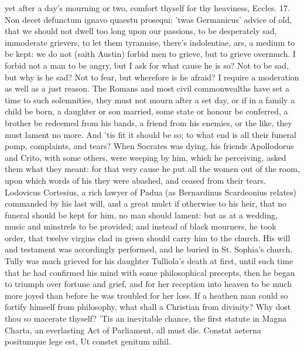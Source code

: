 {yet after a day's mourning or two, comfort thyself for thy heaviness,
Eccles.  17. Non decet defunctum ignavo quaestu prosequi;
'twas Germanicus' advice of old, that we should not dwell too long upon
our passions, to be desperately sad, immoderate grievers, to let them
tyrannise, there's indolentiae, ars, a medium to be kept: we do not
(saith Austin) forbid men to grieve, but to grieve overmuch. I
forbid not a man to be angry, but I ask for what cause he is so? Not to
be sad, but why is he sad? Not to fear, but wherefore is he afraid? I
require a moderation as well as a just reason. The Romans and
most civil commonwealths have set a time to such solemnities, they must
not mourn after a set day, or if in a family a child be born, a
daughter or son married, some state or honour be conferred, a brother
be redeemed from his bands, a friend from his enemies, or the like,
they must lament no more. And 'tis fit it should be so; to what end is
all their funeral pomp, complaints, and tears? When Socrates was dying,
his friends Apollodorus and Crito, with some others, were weeping by
him, which he perceiving, asked them what they meant: for that
very cause he put all the women out of the room, upon which words of
his they were abashed, and ceased from their tears. Lodovicus
Cortesius, a rich lawyer of Padua (as  Bernardinus Scardeonius
relates) commanded by his last will, and a great mulct if otherwise to
his heir, that no funeral should be kept for him, no man should lament:
but as at a wedding, music and minstrels to be provided; and instead of
black mourners, he took order, that twelve virgins clad in green
should carry him to the church. His will and testament was accordingly
performed, and he buried in St. Sophia's church. Tully was much
grieved for his daughter Tulliola's death at first, until such time
that he had confirmed his mind with some philosophical precepts,
then he began to triumph over fortune and grief, and for her
reception into heaven to be much more joyed than before he was troubled
for her loss. If a heathen man could so fortify himself from
philosophy, what shall a Christian from divinity? Why dost thou so
macerate thyself? 'Tis an inevitable chance, the first statute in Magna
Charta, an everlasting Act of Parliament, all must die.
Constat aeterna positumque lege est,
Ut constet genitum nihil.

}
